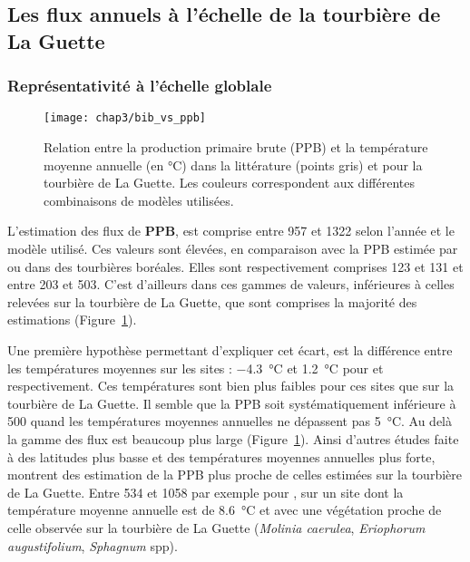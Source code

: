 \subsection{Les flux annuels à l'échelle de la tourbière de La Guette}

\subsubsection{Représentativité à l'échelle globlale}

\begin{figure}
\centering
\texttt{[image: chap3/bib\_vs\_ppb]}
\caption{Relation entre la production primaire brute (PPB) et la température moyenne annuelle (en °C) dans la littérature (points gris) et pour la tourbière de La Guette. Les couleurs correspondent aux différentes combinaisons de modèles utilisées.}
\label{fig:bib_vs_ppb}
\end{figure}

L'estimation des flux de \textbf{PPB}, est comprise entre 957 et \SI{1322}{\gcma} selon l'année et le modèle utilisé.
Ces valeurs sont élevées, en comparaison avec la PPB estimée par  \citet{trudeau2014} ou \citet{peichl2014} dans des tourbières boréales.
Elles sont respectivement comprises  123 et \SI{131}{\gcma} et entre 203 et \SI{503}{\gcma}.
C'est d'ailleurs dans ces gammes de valeurs, inférieures à celles relevées sur la tourbière de La Guette, que sont comprises la majorité des estimations (Figure~\ref{fig:bib_vs_ppb}).


Une première hypothèse permettant d'expliquer cet écart, est la différence entre les températures moyennes sur les sites :
\SI{-4.3}{\degreeCelsius} et \SI{1.2}{\degreeCelsius} pour \citet{trudeau2014} et \citet{peichl2014} respectivement.
Ces températures sont bien plus faibles pour ces sites que sur la tourbière de La Guette.
Il semble que la PPB soit systématiquement inférieure à \SI{500}{\gcma} quand les températures moyennes annuelles ne dépassent pas \SI{5}{\degreeCelsius}. 
Au delà la gamme des flux est beaucoup plus large (Figure~\ref{fig:bib_vs_ppb}).
Ainsi d'autres études faite à des latitudes plus basse et des températures moyennes annuelles plus forte, montrent des estimation de la PPB plus proche de celles estimées sur la tourbière de La Guette.
Entre 534 et \SI{1058}{\gcma} par exemple pour \citet{beyer2015}, sur un site dont la température moyenne annuelle est de \SI{8.6}{\degreeCelsius} et avec une végétation proche de celle observée sur la tourbière de La Guette (\textit{Molinia caerulea}, \textit{Eriophorum augustifolium}, \textit{Sphagnum} spp).

